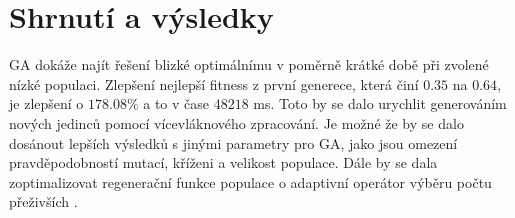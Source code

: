 \documentclass[a4paper,10pt,twocolumn]{article}
\begin{document}
\section{Shrnutí a výsledky}
GA dokáže najít řešení blizké optimálnímu v poměrně krátké době při zvolené nízké populaci. Zlepšení nejlepší fitness z první generece, která činí $0.35$ na $0.64$, je zlepšení o $178.08\%$ a to v čase $48218$ ms. Toto by se dalo urychlit generováním nových jedinců pomocí vícevláknového zpracování. Je možné že by se dalo dosánout lepších výsledků s jinými parametry pro GA, jako jsou omezení pravděpodobností mutací, kříženi a velikost populace. Dále by se dala zoptimalizovat regenerační funkce populace o adaptivní operátor výběru počtu přeživších \cite{adga}. 



\end{document}
